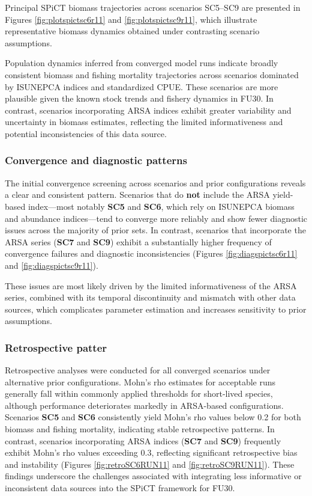 \documentclass[
  12pt,
]{article}
\begin{document}
Principal SPiCT biomass trajectories across scenarios SC5--SC9 are presented in Figures \ref{fig:plotspictsc6r11} and \ref{fig:plotspictsc9r11}, which illustrate representative biomass dynamics obtained under contrasting scenario assumptions.

Population dynamics inferred from converged model runs indicate broadly consistent biomass and fishing mortality trajectories across scenarios dominated by ISUNEPCA indices and standardized CPUE. These scenarios are more plausible given the known stock trends and fishery dynamics in FU30. In contrast, scenarios incorporating ARSA indices exhibit greater variability and uncertainty in biomass estimates, reflecting the limited informativeness and potential inconsistencies of this data source.

\subsubsection{Convergence and diagnostic patterns}\label{convergence-and-diagnostic-patterns}

The initial convergence screening across scenarios and prior configurations reveals a clear and consistent pattern. Scenarios that do \textbf{not} include the ARSA yield-based index---most notably \textbf{SC5} and \textbf{SC6}, which rely on ISUNEPCA biomass and abundance indices---tend to converge more reliably and show fewer diagnostic issues across the majority of prior sets. In contrast, scenarios that incorporate the ARSA series (\textbf{SC7} and \textbf{SC9}) exhibit a substantially higher frequency of convergence failures and diagnostic inconsistencies (Figures \ref{fig:diagspictsc6r11} and \ref{fig:diagspictsc9r11}).

These issues are most likely driven by the limited informativeness of the ARSA series, combined with its temporal discontinuity and mismatch with other data sources, which complicates parameter estimation and increases sensitivity to prior assumptions.

\subsubsection{Retrospective patter}\label{retrospective-patter}

Retrospective analyses were conducted for all converged scenarios under alternative prior configurations. Mohn's rho estimates for acceptable runs generally fall within commonly applied thresholds for short-lived species, although performance deteriorates markedly in ARSA-based configurations. Scenarios \textbf{SC5} and \textbf{SC6} consistently yield Mohn's rho values below 0.2 for both biomass and fishing mortality, indicating stable retrospective patterns. In contrast, scenarios incorporating ARSA indices (\textbf{SC7} and \textbf{SC9}) frequently exhibit Mohn's rho values exceeding 0.3, reflecting significant retrospective bias and instability (Figures \ref{fig:retroSC6RUN11} and \ref{fig:retroSC9RUN11}). These findings underscore the challenges associated with integrating less informative or inconsistent data sources into the SPiCT framework for FU30.
\end{document}
